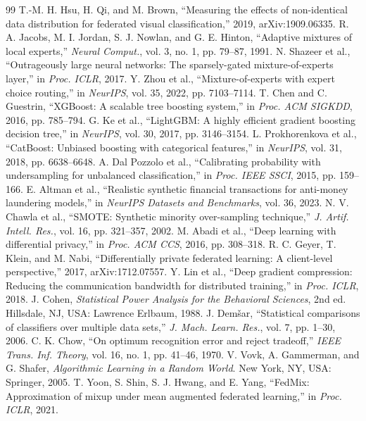 \documentclass[a4paper, 10pt, conference]{ieeeconf}
\begin{document}
\begin{thebibliography}{99}
 T.-M. H. Hsu, H. Qi, and M. Brown, ``Measuring the effects of non-identical data distribution for federated visual classification,'' 2019, arXiv:1909.06335.
 R. A. Jacobs, M. I. Jordan, S. J. Nowlan, and G. E. Hinton, ``Adaptive mixtures of local experts,'' \emph{Neural Comput.}, vol. 3, no. 1, pp. 79--87, 1991.
 N. Shazeer et al., ``Outrageously large neural networks: The sparsely-gated mixture-of-experts layer,'' in \emph{Proc. ICLR}, 2017.
 Y. Zhou et al., ``Mixture-of-experts with expert choice routing,'' in \emph{NeurIPS}, vol. 35, 2022, pp. 7103--7114.
 T. Chen and C. Guestrin, ``XGBoost: A scalable tree boosting system,'' in \emph{Proc. ACM SIGKDD}, 2016, pp. 785--794.
 G. Ke et al., ``LightGBM: A highly efficient gradient boosting decision tree,'' in \emph{NeurIPS}, vol. 30, 2017, pp. 3146--3154.
 L. Prokhorenkova et al., ``CatBoost: Unbiased boosting with categorical features,'' in \emph{NeurIPS}, vol. 31, 2018, pp. 6638--6648.
 A. Dal Pozzolo et al., ``Calibrating probability with undersampling for unbalanced classification,'' in \emph{Proc. IEEE SSCI}, 2015, pp. 159--166.
 E. Altman et al., ``Realistic synthetic financial transactions for anti-money laundering models,'' in \emph{NeurIPS Datasets and Benchmarks}, vol. 36, 2023.
 N. V. Chawla et al., ``SMOTE: Synthetic minority over-sampling technique,'' \emph{J. Artif. Intell. Res.}, vol. 16, pp. 321--357, 2002.
 M. Abadi et al., ``Deep learning with differential privacy,'' in \emph{Proc. ACM CCS}, 2016, pp. 308--318.
 R. C. Geyer, T. Klein, and M. Nabi, ``Differentially private federated learning: A client-level perspective,'' 2017, arXiv:1712.07557.
 Y. Lin et al., ``Deep gradient compression: Reducing the communication bandwidth for distributed training,'' in \emph{Proc. ICLR}, 2018.
 J. Cohen, \emph{Statistical Power Analysis for the Behavioral Sciences}, 2nd ed. Hillsdale, NJ, USA: Lawrence Erlbaum, 1988.
 J. Dem\v{s}ar, ``Statistical comparisons of classifiers over multiple data sets,'' \emph{J. Mach. Learn. Res.}, vol. 7, pp. 1--30, 2006.
 C. K. Chow, ``On optimum recognition error and reject tradeoff,'' \emph{IEEE Trans. Inf. Theory}, vol. 16, no. 1, pp. 41--46, 1970.
 V. Vovk, A. Gammerman, and G. Shafer, \emph{Algorithmic Learning in a Random World}. New York, NY, USA: Springer, 2005.
 T. Yoon, S. Shin, S. J. Hwang, and E. Yang, ``FedMix: Approximation of mixup under mean augmented federated learning,'' in \emph{Proc. ICLR}, 2021.

\end{thebibliography}
\end{document}
